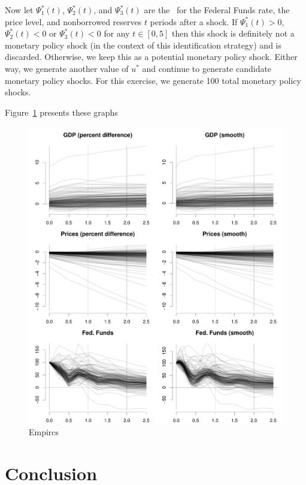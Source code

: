 \documentclass[12pt,fleqn]{article}
\begin{document}
Now let $\Psi^*_1(t)$, $\Psi^*_2(t)$, and $\Psi^*_3(t)$ are the \IRFs\
for the Federal Funds rate, the price level, and nonborrowed reserves
$t$ periods after a shock. If $\Psi^*_1(t) > 0$, $\Psi^*_2(t) < 0$ or
$\Psi^*_3(t) < 0$ for any $t \in [0,5]$ then this shock is definitely
not a monetary policy shock (in the context of this identification
strategy) and is discarded. Otherwise, we keep this as a potential
monetary policy shock. Either way, we generate another value of $u^*$
and continue to generate candidate monetary policy shocks. For this
exercise, we generate 100 total monetary policy shocks.

Figure~\ref{fig:5} presents these graphs

\begin{figure}[t]
  \centering
  \includegraphics{graphs/empirics}
  \caption{Empircs}
  \label{fig:5}
\end{figure}

\section{Conclusion}
\label{S4}
\end{document}
